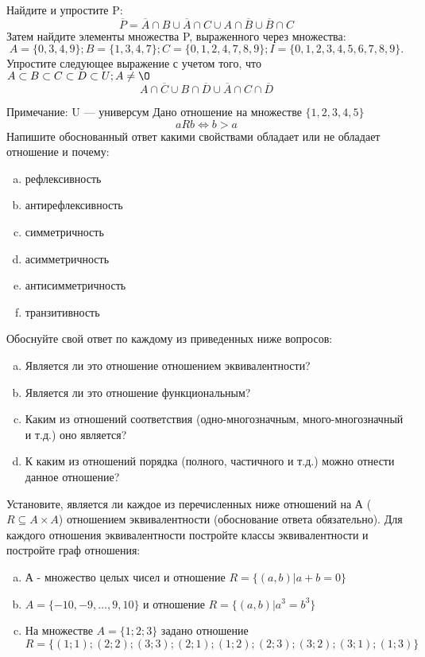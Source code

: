 \documentclass[10pt]{exam}
\begin{document}
\begin{questions}
\question
Найдите и упростите P:
\begin{equation*}
\overline{P} = \overline{A} \cap B \cup \overline{A} \cap C \cup A \cap \overline{B} \cup \overline{B} \cap C
\end{equation*}
Затем найдите элементы множества P, выраженного через множества:
\begin{equation*}
A = \{0, 3, 4, 9\}; 
B = \{1, 3, 4, 7\};
C = \{0, 1, 2, 4, 7, 8, 9\};
I = \{0, 1, 2, 3, 4, 5, 6, 7, 8, 9\}.
\end{equation*}\question
Упростите следующее выражение с учетом того, что $A\subset B \subset C \subset D \subset U; A \neq \O$
\begin{equation*}
A \cap  \overline{C} \cup B \cap \overline{D} \cup  \overline{A} \cap C \cap  \overline{D}
\end{equation*}

Примечание: U — универсум\question
Дано отношение на множестве $\{1, 2, 3, 4, 5\}$ 
\begin{equation*}
aRb \iff b > a
\end{equation*}
Напишите обоснованный ответ какими свойствами обладает или не обладает отношение и почему:   
\begin{enumerate} [a)]\setcounter{enumi}{0}
\item рефлексивность
\item антирефлексивность
\item симметричность
\item асимметричность
\item антисимметричность
\item транзитивность
\end{enumerate}

Обоснуйте свой ответ по каждому из приведенных ниже вопросов:
\begin{enumerate} [a)]\setcounter{enumi}{0}
    \item Является ли это отношение отношением эквивалентности?
    \item Является ли это отношение функциональным?
    \item Каким из отношений соответствия (одно-многозначным, много-многозначный и т.д.) оно является?
    \item К каким из отношений порядка (полного, частичного и т.д.) можно отнести данное отношение?
\end{enumerate}

\question
Установите, является ли каждое из перечисленных ниже отношений на А ($R \subseteq A \times A$) отношением эквивалентности (обоснование ответа обязательно). Для каждого отношения эквивалентности 
постройте классы эквивалентности и постройте граф отношения:
\begin{enumerate}[a)]\setcounter{enumi}{0}
\item А - множество целых чисел и отношение $R = \{(a,b)|a + b = 0\}$
\item $A = \{-10, -9, …, 9, 10\}$ и отношение $R = \{(a,b)|a^{3} = b^{3}\}$
\item На множестве $A = \{1; 2; 3\}$ задано отношение $R = \{(1; 1); (2; 2); (3; 3); (2; 1); (1; 2); (2; 3); (3; 2); (3; 1); (1; 3)\}$


\end{enumerate}
\end{questions}
\end{document}
